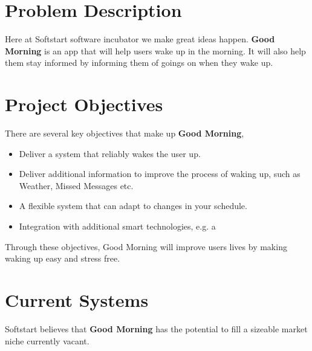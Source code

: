 \documentclass[11pt]{article}
\begin{document}

%
\section{Problem Description}\label{problem-description}

Here at Softstart software incubator we make great ideas happen.
\textbf{Good Morning} is an app that will help users wake up in the
morning. It will also help them stay informed by informing them of
goings on when they wake up.


%
\section{Project Objectives}\label{project-objectives}

There are several key objectives that make up \textbf{Good Morning},

\begin{itemize}
\item
  Deliver a system that reliably wakes the user up.
\item
  Deliver additional information to improve the process of waking up, such as Weather, Missed Messages etc.
\item
  A flexible system that can adapt to changes in your schedule.
\item
  Integration with additional smart technologies, e.g. a 
\end{itemize}

Through these objectives, Good Morning will improve users lives by making waking up easy and stress free.


%
\section{Current Systems}\label{current-systems}

Softstart believes that \textbf{Good Morning} has the potential to fill
a sizeable market niche currently vacant.


%
\end{document}
